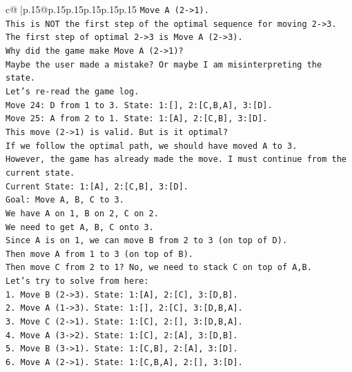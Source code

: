 \documentclass{article}
\begin{document}
{\begin{supertabular}{c@{$\;$}|p{.15\linewidth}@{}p{.15\linewidth}p{.15\linewidth}p{.15\linewidth}p{.15\linewidth}p{.15\linewidth}}
{{{\texttt{Move A (2{-}>1).} \\
\texttt{This is NOT the first step of the optimal sequence for moving 2{-}>3.} \\
\texttt{The first step of optimal 2{-}>3 is Move A (2{-}>3).} \\
\texttt{Why did the game make Move A (2{-}>1)?} \\
\texttt{Maybe the user made a mistake? Or maybe I am misinterpreting the state.} \\
\texttt{Let's re{-}read the game log.} \\
\texttt{Move 24: D from 1 to 3. State: 1:{[}{]}, 2:{[}C,B,A{]}, 3:{[}D{]}.} \\
\texttt{Move 25: A from 2 to 1. State: 1:{[}A{]}, 2:{[}C,B{]}, 3:{[}D{]}.} \\
\texttt{This move (2{-}>1) is valid. But is it optimal?} \\
\texttt{If we follow the optimal path, we should have moved A to 3.} \\
\texttt{However, the game has already made the move. I must continue from the current state.} \\
\texttt{Current State: 1:{[}A{]}, 2:{[}C,B{]}, 3:{[}D{]}.} \\
\texttt{Goal: Move A, B, C to 3.} \\
\texttt{We have A on 1, B on 2, C on 2.} \\
\texttt{We need to get A, B, C onto 3.} \\
\texttt{Since A is on 1, we can move B from 2 to 3 (on top of D).} \\
\texttt{Then move A from 1 to 3 (on top of B).} \\
\texttt{Then move C from 2 to 1? No, we need to stack C on top of A,B.} \\
\texttt{Let's try to solve from here:} \\
\texttt{1. Move B (2{-}>3). State: 1:{[}A{]}, 2:{[}C{]}, 3:{[}D,B{]}.} \\
\texttt{2. Move A (1{-}>3). State: 1:{[}{]}, 2:{[}C{]}, 3:{[}D,B,A{]}.} \\
\texttt{3. Move C (2{-}>1). State: 1:{[}C{]}, 2:{[}{]}, 3:{[}D,B,A{]}.} \\
\texttt{4. Move A (3{-}>2). State: 1:{[}C{]}, 2:{[}A{]}, 3:{[}D,B{]}.} \\
\texttt{5. Move B (3{-}>1). State: 1:{[}C,B{]}, 2:{[}A{]}, 3:{[}D{]}.} \\
\texttt{6. Move A (2{-}>1). State: 1:{[}C,B,A{]}, 2:{[}{]}, 3:{[}D{]}.} \\
}}}
\end{supertabular}}
\end{document}
